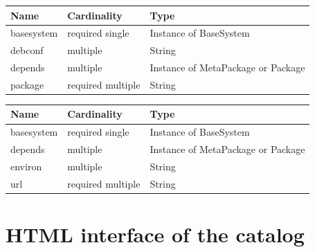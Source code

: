 \begin{table}[!h]
   \begin{center}
         \label{tab:main_class_debian}
	\begin{tabular}{p{3cm}p{3cm}p{6cm}}
	\textbf{Name}  & \textbf{Cardinality}  & \textbf{Type}\\
	\hline
	basesystem     & required single       & Instance of BaseSystem       \\
	debconf        & multiple              & String       \\
	depends        & multiple              & Instance of MetaPackage  or Package      \\
	package        & required multiple              & String      \\
	\end{tabular} 
   \end{center}
\end{table}

\begin{table}[!h]
   \begin{center}
         \label{tab:main_class_tar}
	\begin{tabular}{p{3cm}p{3cm}p{6cm}}
	\textbf{Name}  & \textbf{Cardinality}  & \textbf{Type}\\
	\hline
	basesystem     & required single       & Instance of BaseSystem       \\
	depends        & multiple              & Instance of MetaPackage or Package      \\
	environ        & multiple              & String       \\
	url            & required multiple     & String      \\
	\end{tabular} 
   \end{center}
\end{table}

\section{HTML interface of the catalog}

